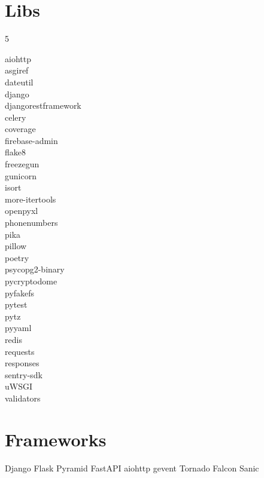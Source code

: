 \documentclass [8pt] {extarticle}
\begin{document}
    \section {Libs}

    \begin {multicols} {5}

    aiohttp \\
    asgiref \\
    dateutil \\
    django \\
    djangorestframework \\
    celery \\
    coverage \\
    firebase-admin \\
    flake8 \\
    freezegun \\
    gunicorn \\
    isort \\
    more-itertools \\
    openpyxl \\
    phonenumbers \\
    pika \\
    pillow \\
    poetry \\
    psycopg2-binary \\
    pycryptodome \\
    pyfakefs \\
    pytest \\
    pytz \\
    pyyaml \\
    redis \\
    requests \\
    responses \\
    sentry-sdk \\
    uWSGI \\
    validators \\

    \end {multicols}

    \section {Frameworks}

    Django \quad
    Flask \quad
    Pyramid \quad
    FastAPI \quad
    aiohttp \quad
    gevent \quad
    Tornado \quad
    Falcon \quad
    Sanic

    \pagebreak
\end{document}
